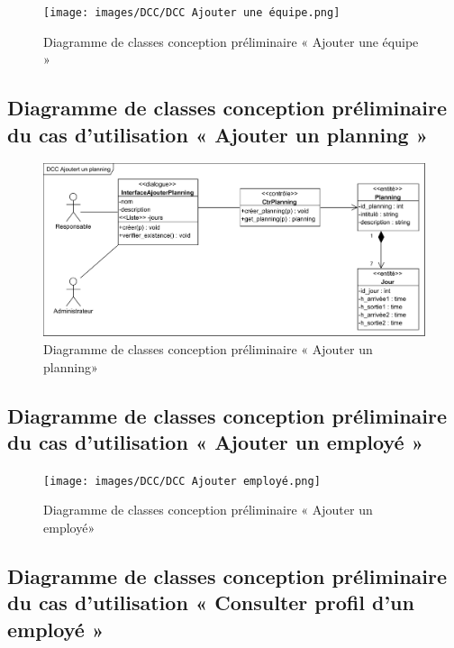 \clearpage

\begin{figure}[h!]
    \centering
    \texttt{[image: images/DCC/DCC Ajouter une équipe.png]}
    \caption{Diagramme de classes conception préliminaire « Ajouter une équipe »}
    \label{fig43}
\end{figure}
        
\subsection*{Diagramme de classes conception préliminaire du cas d'utilisation « Ajouter un planning »}

\begin{figure}[h!]
    \centering
    \includegraphics[scale=0.7]{images/DCC/DCC Ajoutert un planning.png}
    \caption{Diagramme de classes conception préliminaire « Ajouter un planning»}
    \label{fig44}
\end{figure}
        
\clearpage

\subsection*{Diagramme de classes conception préliminaire du cas d'utilisation « Ajouter un employé »}

\begin{figure}[h!]
    \centering
    \texttt{[image: images/DCC/DCC Ajouter employé.png]}
    \caption{Diagramme de classes conception préliminaire « Ajouter un employé»}
    \label{fig45}
\end{figure}


\subsection*{Diagramme de classes conception préliminaire du cas d'utilisation « Consulter profil d'un employé »}

